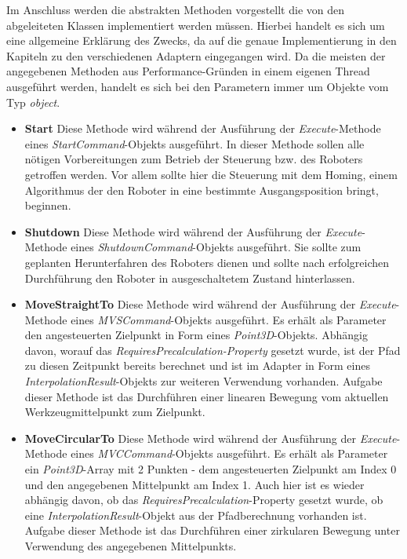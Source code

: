 Im Anschluss werden die abstrakten Methoden vorgestellt die von den abgeleiteten Klassen implementiert werden müssen. Hierbei handelt es sich um eine allgemeine Erklärung des Zwecks, da auf die genaue Implementierung in den Kapiteln zu den verschiedenen Adaptern eingegangen wird. Da die meisten der angegebenen Methoden aus Performance-Gründen in einem eigenen Thread ausgeführt werden, handelt es sich bei den Parametern immer um Objekte vom Typ \textit{object}. 
\begin{itemize}
\item \textbf{Start}
\newline
Diese Methode wird während der Ausführung der \textit{Execute}-Methode eines \textit{StartCommand}-Objekts ausgeführt. In dieser Methode sollen alle nötigen Vorbereitungen zum Betrieb der Steuerung bzw. des Roboters getroffen werden. Vor allem sollte hier die Steuerung mit dem Homing, einem Algorithmus der den Roboter in eine bestimmte Ausgangsposition bringt, beginnen.
\item \textbf{Shutdown}
\newline
Diese Methode wird während der Ausführung der \textit{Execute}-Methode eines \textit{ShutdownCommand}-Objekts ausgeführt. Sie sollte zum geplanten Herunterfahren des Roboters dienen und sollte nach erfolgreichen Durchführung den Roboter in ausgeschaltetem Zustand hinterlassen.
\item \textbf{MoveStraightTo}
\newline
Diese Methode wird während der Ausführung der \textit{Execute}-Methode eines \textit{MVSCommand}-Objekts ausgeführt. Es erhält als Parameter den angesteuerten Zielpunkt in Form eines \textit{Point3D}-Objekts. Abhängig davon, worauf das \textit{RequiresPrecalculation-Property} gesetzt wurde, ist der Pfad zu diesen Zeitpunkt bereits berechnet und ist im Adapter in Form eines \textit{InterpolationResult}-Objekts zur weiteren Verwendung vorhanden. Aufgabe dieser Methode ist das Durchführen einer linearen Bewegung vom aktuellen Werkzeugmittelpunkt zum Zielpunkt.
\item \textbf{MoveCircularTo}
\newline
Diese Methode wird während der Ausführung der \textit{Execute}-Methode eines \textit{MVCCommand}-Objekts ausgeführt. Es erhält als Parameter ein \textit{Point3D}-Array mit 2 Punkten - dem angesteuerten Zielpunkt am Index 0 und den angegebenen Mittelpunkt am Index 1. Auch hier ist es wieder abhängig davon, ob das \textit{RequiresPrecalculation}-Property gesetzt wurde, ob eine \textit{InterpolationResult}-Objekt aus der Pfadberechnung vorhanden ist. Aufgabe dieser Methode ist das Durchführen einer zirkularen Bewegung unter Verwendung des angegebenen Mittelpunkts.

\end{itemize}

